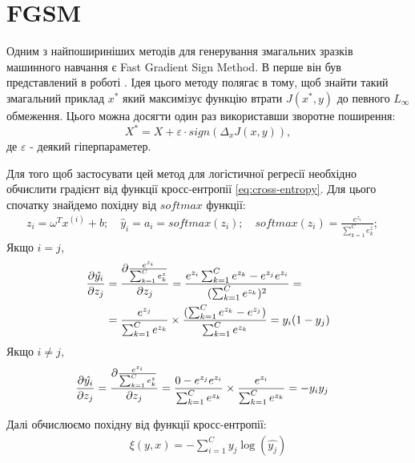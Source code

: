 \documentclass[a4paper,14pt]{extreport}
\newcommand{\tran}{^{T}}
\newcommand{\ith}{^{(i)}}
\begin{document}
	\section{FGSM}
	Одним з найпошириніших методів для генерування змагальних зразків машинного навчання є Fast Gradient Sign Method. В перше він був представлений в роботі \textcite{goodfellow2014explaining}. Ідея цього методу полягає в тому, щоб знайти такий змагальний приклад $x^{*}$ який максимізує функцію втрати $J(x^{*}, y)$ до певного $L_{\infty}$ обмеження. Цього можна досягти один раз використавши зворотне поширення:
	\begin{equation}
	X^{*} = X + \varepsilon \cdot sign(\Delta_x J(x, y)),
	\end{equation}
	де $\varepsilon$ - деякий гіперпараметер.
	
	Для того щоб застосувати цей метод для логістичної регресії необхідно обчислити градієнт від функції кросс-ентропії \ref{eq:cross-entropy}. Для цього спочатку знайдемо похідну від $softmax$ функції:
	\begin{align*}
		z_i = \omega\tran x\ith + b; \quad
		\hat{y}_i = a_i = softmax(z_i); \quad
		softmax(z_i) = \frac{e^{z_i}}{\sum_{k=1}^{C} e_k^z}; \quad
	\end{align*}
	Якщо $i = j$,
	\begin{align}
	    \pdv{\hat{y_i}}{z_j} 
	    &=
	    \pdv{\frac{e^{z_i}}{\sum_{k=1}^{C} e_k^z}}{z_j} 
	    =
	    \frac{e^{z_i} \sum_{k=1}^{C} e^{z_k} - e^{z_j} e^{z_i}}{(\sum_{k=1}^{C}  e^{z_k})^2} 
	    = \\& =
	    \frac{e^{z_j}}{\sum_{k=1}^{C}  e^{z_k}} \times \frac{(\sum_{k=1}^{C} e^{z_k} - e^{z_j})}{\sum_{k=1}^{C}  e^{z_k}} 
	    = 
	    y_i(1-y_j)
	\end{align}
	Якщо $i \neq j$,
	\begin{align}
		\pdv{\hat{y_i}}{z_j}
		&=
		\pdv{\frac{e^{z_i}}{\sum_{k=1}^{C} e_k^z}}{z_j} 
		=
		\frac{0 - e^{z_j} e^{z_i}}{\sum_{k=1}^{C}  e^{z_k}} \times \frac{e^{z_i}}{\sum_{k=1}^{C} e^{z_k}} 
		= 
		-y_i y_j 
	\end{align}
	
	\begingroup
	\setlength{\abovedisplayskip}{0pt}
	\setlength{\belowdisplayskip}{0pt}
	
	Далі обчислюємо похідну від функції кросс-ентропії:
	\begin{align*}
		\xi(y, x) = - \sum_{i=1}^{C} y_j  \log (\hat{y_j})
	\end{align*}
\end{document}
